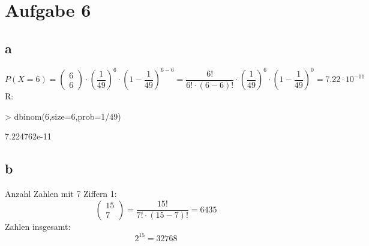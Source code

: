 

\section{Aufgabe 6}
\subsection{a}
\[ P(X=6) = \left(\begin{array}{l}6\\6\end{array}\right) 
\cdot \left(\frac{1}{49}\right)^6 \cdot \left(1 - \frac{1}{49}\right)^{6-6} 
= \frac{6!}{6! \cdot (6-6)!} \cdot \left(\frac{1}{49}\right)^6 
\cdot \left(1 - \frac{1}{49}\right)^0 = 7.22 \cdot 10^{-11} \]
R:
\begin{Schunk}
\begin{Sinput}
> dbinom(6,size=6,prob=1/49)
\end{Sinput}
\begin{Soutput}
[1] 7.224762e-11
\end{Soutput}
\end{Schunk}

\subsection{b}
Anzahl Zahlen mit 7 Ziffern 1: 
\[ \left(\begin{array}{l}15\\7\end{array}\right) 
= \frac{15!}{7! \cdot (15-7)!} = 6435 \]
Zahlen insgesamt: 
\[ 2^{15} = 32768 \]
